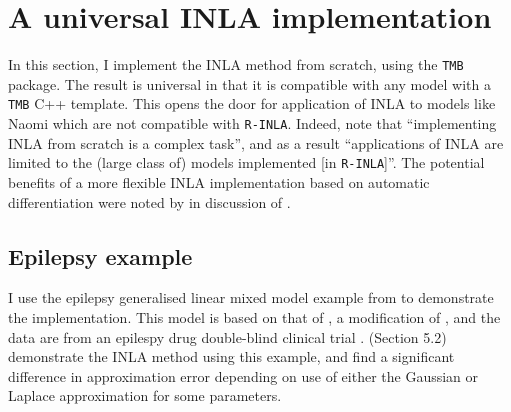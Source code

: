 \documentclass[a4paper, nobind]{templates/ociamthesis}
\begin{document}
\hypertarget{a-universal-inla-implementation}{%
\section{A universal INLA implementation}\label{a-universal-inla-implementation}}

In this section, I implement the INLA method from scratch, using the \texttt{TMB} package.
The result is universal in that it is compatible with any model with a \texttt{TMB} C++ template.
This opens the door for application of INLA to models like Naomi which are not compatible with \texttt{R-INLA}.
Indeed, \textcite{martino2019integrated} note that ``implementing INLA from scratch is a complex task'', and as a result ``applications of INLA are limited to the (large class of) models implemented {[}in \texttt{R-INLA}{]}''.
The potential benefits of a more flexible INLA implementation based on automatic differentiation were noted by \textcite{skaug2009approximate} in discussion of \textcite{rue2009approximate}.

\hypertarget{epilepsy-example}{%
\subsection{Epilepsy example}\label{epilepsy-example}}

I use the epilepsy generalised linear mixed model example from \textcite{spiegelhalter1996bugs} to demonstrate the implementation.
This model is based on that of \textcite{breslow1993approximate}, a modification of \textcite{thall1990some}, and the data are from an epilespy drug double-blind clinical trial \autocite{leppik1985double}.
\textcite{rue2009approximate} (Section 5.2) demonstrate the INLA method using this example, and find a significant difference in approximation error depending on use of either the Gaussian or Laplace approximation for some parameters.
\end{document}
